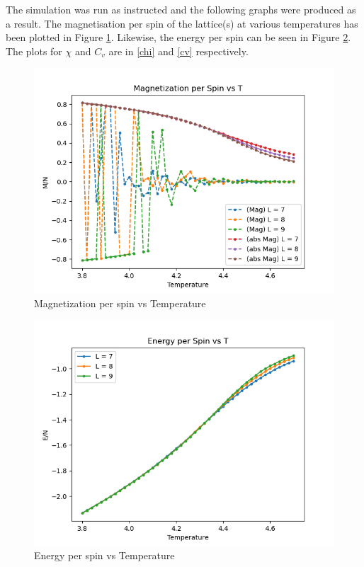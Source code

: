 \documentclass[11 pt]{article}
\begin{document}
The simulation was run as instructed and the following graphs were produced as a result. The magnetisation per spin of the lattice(s) at various temperatures has been plotted in Figure \ref{magtemp}. Likewise, the energy per spin can be seen in Figure \ref{etemp}. The plots for $\chi$ and $C_v$ are in \ref{chi} and \ref{cv} respectively.

\begin{figure}
\begin{center}
\includegraphics[width=3.0 in]{"../figures/Q7-M.png"}
\caption{Magnetization per spin vs Temperature}
\label{magtemp}
\end{center}
\end{figure}

\begin{figure}
\begin{center}
\includegraphics[width=3.0 in]{"../figures/Q7-E.png"}
\caption{Energy per spin vs Temperature}
\label{etemp}
\end{center}
\end{figure}
\end{document}
